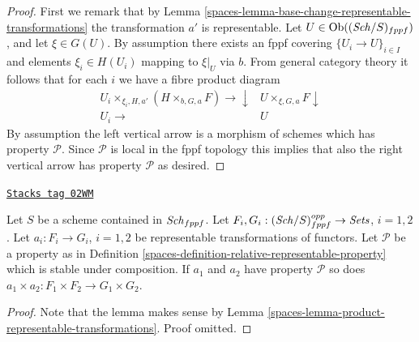 \begin{proof}

First we remark that by
Lemma \ref{spaces-lemma-base-change-representable-transformations}
the transformation $a'$ is representable.
Let $U \in \operatorname{Ob}((\mathit{Sch}/S)_{fppf})$, and let
$\xi \in G(U)$. By assumption there exists an fppf covering
$\{U_i \to U\}_{i \in I}$ and elements $\xi_i \in H(U_i)$ mapping
to $\xi|_U$ via $b$. From general category theory it follows that for
each $i$ we have a fibre product diagram
$$
\begin{array}{cc}U_i \times_{\xi_i, H, a'} (H \times_{b, G, a} F) \longrightarrow\downarrow & U \times_{\xi, G, a} F \downarrow \\ U_i \longrightarrow & U\end{array}
$$
By assumption the left vertical arrow is a morphism of schemes which
has property $\mathcal{P}$. Since $\mathcal{P}$ is local in the fppf
topology this implies that also the right vertical arrow has property
$\mathcal{P}$ as desired.
\end{proof}

\begin{lemma}
\label{spaces-lemma-product-representable-transformations-property}
\href{https://stacks.math.columbia.edu/tag/02WM}{\texttt{Stacks tag 02WM}}

Let $S$ be a scheme contained in $\mathit{Sch}_{fppf}$.
Let $F_i, G_i : (\mathit{Sch}/S)_{fppf}^{opp} \to \textit{Sets}$,
$i = 1, 2$.
Let $a_i : F_i \to G_i$, $i = 1, 2$ be representable transformations
of functors.
Let $\mathcal{P}$ be a property as in
Definition \ref{spaces-definition-relative-representable-property}
which is stable under composition.
If $a_1$ and $a_2$ have property $\mathcal{P}$ so does
$a_1 \times a_2 : F_1 \times F_2 \longrightarrow G_1 \times G_2$.
\end{lemma}

\begin{proof}

Note that the lemma makes sense by
Lemma \ref{spaces-lemma-product-representable-transformations}.
Proof omitted.
\end{proof}

